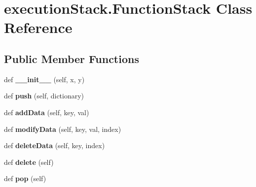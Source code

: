 \hypertarget{classexecution_stack_1_1_function_stack}{}\section{execution\+Stack.\+Function\+Stack Class Reference}
\label{classexecution_stack_1_1_function_stack}
\subsection*{Public Member Functions}
\begin{DoxyCompactItemize}
\item 
\mbox{\label{classexecution_stack_1_1_function_stack_a7a601c313e47d7258f76e9fbf88adef7}} 
def {\bfseries \+\_\+\+\_\+init\+\_\+\+\_\+} (self, x, y)
\item 
\mbox{\label{classexecution_stack_1_1_function_stack_a9febcf526ee5b0c7b88e861a073627ac}} 
def {\bfseries push} (self, dictionary)
\item 
\mbox{\label{classexecution_stack_1_1_function_stack_a3a5ced032259c98b30344cbc6e775292}} 
def {\bfseries add\+Data} (self, key, val)
\item 
\mbox{\label{classexecution_stack_1_1_function_stack_a883469228441f12954d761586ce9fe5b}} 
def {\bfseries modify\+Data} (self, key, val, index)
\item 
\mbox{\label{classexecution_stack_1_1_function_stack_a1c5e275752c116640cfe37c997050dff}} 
def {\bfseries delete\+Data} (self, key, index)
\item 
\mbox{\label{classexecution_stack_1_1_function_stack_ab68d818d8a7d65295384d00792805665}} 
def {\bfseries delete} (self)
\item 
\mbox{\label{classexecution_stack_1_1_function_stack_a10c19ec4bd97f79d345bb979cf68fe9d}} 
def {\bfseries pop} (self)
\end{DoxyCompactItemize}
